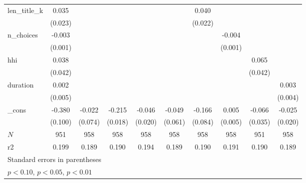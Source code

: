 \begin{table}[htbp]
\begin{tabular}{l*{9}{c}}
len\_title\_k&    0.035         &                  &                  &                  &                  &    0.040\sym{*}  &                  &                  &                  \\
          &  (0.023)         &                  &                  &                  &                  &  (0.022)         &                  &                  &                  \\
n\_choices &   -0.003\sym{***}&                  &                  &                  &                  &                  &   -0.004\sym{***}&                  &                  \\
          &  (0.001)         &                  &                  &                  &                  &                  &  (0.001)         &                  &                  \\
hhi       &    0.038         &                  &                  &                  &                  &                  &                  &    0.065         &                  \\
          &  (0.042)         &                  &                  &                  &                  &                  &                  &  (0.042)         &                  \\
duration  &    0.002         &                  &                  &                  &                  &                  &                  &                  &    0.003         \\
          &  (0.005)         &                  &                  &                  &                  &                  &                  &                  &  (0.004)         \\
\_cons    &   -0.380\sym{***}&   -0.022         &   -0.215\sym{***}&   -0.046\sym{**} &   -0.049         &   -0.166\sym{*}  &    0.005         &   -0.066\sym{*}  &   -0.025         \\
          &  (0.100)         &  (0.074)         &  (0.018)         &  (0.020)         &  (0.061)         &  (0.084)         &  (0.005)         &  (0.035)         &  (0.020)         \\
\hline
\(N\)     &      951         &      958         &      958         &      958         &      958         &      958         &      958         &      951         &      958         \\
r2        &    0.199         &    0.189         &    0.190         &    0.194         &    0.189         &    0.190         &    0.191         &    0.190         &    0.189         \\
\hline\hline
\multicolumn{10}{l}{\footnotesize Standard errors in parentheses}\\
\multicolumn{10}{l}{\footnotesize \sym{*} \(p<0.10\), \sym{**} \(p<0.05\), \sym{***} \(p<0.01\)}\\
\end{tabular}
\end{table}
